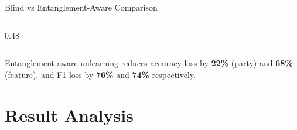 \documentclass[aspectratio=169, 11pt]{beamer}
\begin{document}
\begin{frame}{Blind vs Entanglement-Aware Comparison}
\begin{columns}[T]
\begin{column}{0.48\textwidth}
\begin{center}
      \end{center}
    \end{column}
  \end{columns}
  \vspace{0.3cm}
  \begin{center}
    \footnotesize
    Entanglement-aware unlearning reduces accuracy loss by \textbf{22\%} (party) and \textbf{68\%} (feature), and F1 loss by \textbf{76\%} and \textbf{74\%} respectively.
  \end{center}
\end{frame}

\section{Result Analysis}
\end{document}

